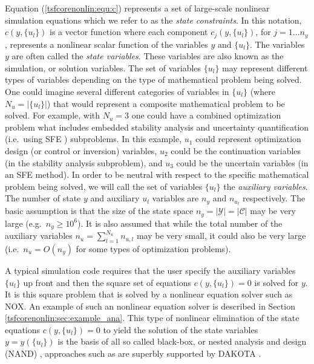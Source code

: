 Equation (\ref{tsfcorenonlin:equ:c}) represents a set of large-scale
nonlinear simulation equations which we refer to as the \textit{state
constraints}.  In this notation, $c(y,\{u_l\})$ is a vector function
where each component $c_j(y,\{u_l\})$, for $j = 1 \ldots n_y$,
represents a nonlinear scalar function of the variables $y$ and
$\{u_l\}$.  The variables $y$ are often called the {\em state
variables}.  These variables are also known as the simulation, or
solution variables.  The set of variables $\{u_l\}$ may represent
different types of variables depending on the type of mathematical
problem being solved.  One could imagine several different categories
of variables in $\{u_l\}$ (where $N_u = |\{u_l\}|$) that would
represent a composite mathematical problem to be solved.  For example,
with $N_u = 3$ one could have a combined optimization problem what
includes embedded stability analysis and uncertainty quantification
(i.e.~using SFE \cite{ref:sfe}) subproblems.  In this example, $u_1$
could represent optimization design (or control or inversion)
variables, $u_2$ could be the continuation variables (in the stability
analysis subproblem), and $u_3$ could be the uncertain variables (in
an SFE method).  In order to be neutral with respect to the specific
mathematical problem being solved, we will call the set of variables
$\{u_l\}$ the {\em auxiliary variables}.  The number of state $y$ and
auxiliary $u_l$ variables are $n_y$ and $n_{u_l}$ respectively.  The
basic assumption is that the size of the state space $n_y =
|\mathcal{Y}| = |\mathcal{C}|$ may be very large (e.g.~$n_y \ge
10^{6}$).  It is also assumed that while the total number of the
auxiliary variables $n_u =
\sum^{N_u}_{l=1} n_{u,l}$ may be very small, it could also be very
large (i.e.~$n_u = O(n_y)$ for some types of optimization problems).

A typical simulation code requires that the user specify the auxiliary
variables $\{u_l\}$ up front and then the square set of equations
$c(y,\{u_l\})=0$ is solved for $y$.  It is this square problem that is
solved by a nonlinear equation solver such as NOX.  An example of such
an nonlinear equation solver is described in Section
\ref{tsfcorenonlin:sec:example_ana}.  This type of nonlinear
elimination of the state equations $c(y,\{u_l\})=0$ to yield the
solution of the state variables $y = y(\{u_l\})$ is the basis of all
so called black-box, or nested analysis and design (NAND)
\cite[Chapter 2]{ref:PDELDRD}, approaches such as are superbly
supported by DAKOTA \cite{ref:eldred_dakota_2001}.

